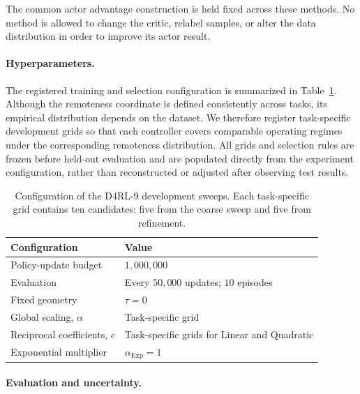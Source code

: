\documentclass{article}
\theoremstyle{plain}
\theoremstyle{definition}
\theoremstyle{remark}
\begin{document}
The common actor advantage construction is held fixed across these
methods. No method is allowed to change the critic, relabel samples, or
alter the data distribution in order to improve its actor result.

\paragraph{Hyperparameters.}

The registered training and selection configuration is summarized in
Table~\ref{tab:d4rl_registered_config}. Although the remoteness
coordinate is defined consistently across tasks, its empirical
distribution depends on the dataset. We therefore register
task-specific development grids so that each controller covers
comparable operating regimes under the corresponding remoteness
distribution. All grids and selection rules are frozen before
held-out evaluation and are populated directly from the experiment
configuration, rather than reconstructed or adjusted after observing
test results.

\begin{table}[t]
\centering
\caption{Configuration of the D4RL-9 development sweeps. Each
task-specific grid contains ten candidates: five from the coarse sweep
and five from refinement.}
\label{tab:d4rl_registered_config}

\small
\setlength{\tabcolsep}{6pt}
\renewcommand{\arraystretch}{1.10}

\begin{tabular}{@{}ll@{}}
\toprule
Configuration & Value \\
\midrule
Policy-update budget
& $1{,}000{,}000$ \\
Evaluation
& Every $50{,}000$ updates; $10$ episodes \\
Fixed geometry
& $\tau=0$ \\
Global scaling, $\alpha$
& Task-specific grid \\
Reciprocal coefficients, $c$
& Task-specific grids for Linear and Quadratic \\
Exponential multiplier
& $\alpha_{\mathrm{Exp}}=1$ \\
\bottomrule
\end{tabular}
\end{table}

\paragraph{Evaluation and uncertainty.}
\end{document}
